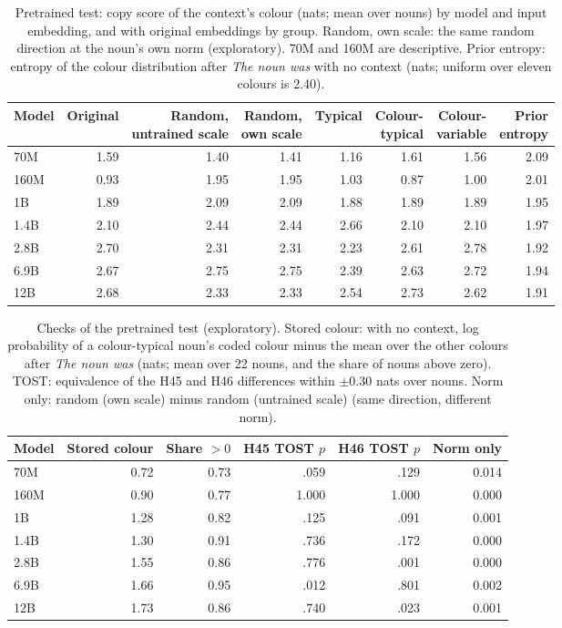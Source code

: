 \begin{table}[!htbp]
\centering\small
\caption{Pretrained test: copy score of the context's colour (nats; mean over nouns) by model and input embedding, and with original embeddings by group. Random, own scale: the same random direction at the noun's own norm (exploratory). 70M and 160M are descriptive. Prior entropy: entropy of the colour distribution after \emph{The \textit{noun} was} with no context (nats; uniform over eleven colours is 2.40).}
\label{tab:N7}
\begin{tabular}{@{}lrrrrrrr@{}}
\toprule
Model & Original & \shortstack{Random,\\untrained scale} & \shortstack{Random,\\own scale} & Typical & \shortstack{Colour-\\typical} & \shortstack{Colour-\\variable} & \shortstack{Prior\\entropy} \\
\midrule
70M & 1.59 & 1.40 & 1.41 & 1.16 & 1.61 & 1.56 & 2.09 \\
160M & 0.93 & 1.95 & 1.95 & 1.03 & 0.87 & 1.00 & 2.01 \\
1B & 1.89 & 2.09 & 2.09 & 1.88 & 1.89 & 1.89 & 1.95 \\
1.4B & 2.10 & 2.44 & 2.44 & 2.66 & 2.10 & 2.10 & 1.97 \\
2.8B & 2.70 & 2.31 & 2.31 & 2.23 & 2.61 & 2.78 & 1.92 \\
6.9B & 2.67 & 2.75 & 2.75 & 2.39 & 2.63 & 2.72 & 1.94 \\
12B & 2.68 & 2.33 & 2.33 & 2.54 & 2.73 & 2.62 & 1.91 \\
\bottomrule
\end{tabular}
\end{table}

\begin{table}[!htbp]
\centering\small
\caption{Checks of the pretrained test (exploratory). Stored colour: with no context, log probability of a colour-typical noun's coded colour minus the mean over the other colours after \emph{The \textit{noun} was} (nats; mean over 22 nouns, and the share of nouns above zero). TOST: equivalence of the H45 and H46 differences within $\pm$0.30 nats over nouns. Norm only: random (own scale) minus random (untrained scale) (same direction, different norm).}
\label{tab:N12}
\begin{tabular}{@{}lrrrrr@{}}
\toprule
Model & Stored colour & Share $>0$ & H45 TOST $p$ & H46 TOST $p$ & Norm only \\
\midrule
70M & 0.72 & 0.73 & .059 & .129 & 0.014 \\
160M & 0.90 & 0.77 & 1.000 & 1.000 & 0.000 \\
1B & 1.28 & 0.82 & .125 & .091 & 0.001 \\
1.4B & 1.30 & 0.91 & .736 & .172 & 0.000 \\
2.8B & 1.55 & 0.86 & .776 & .001 & 0.000 \\
6.9B & 1.66 & 0.95 & .012 & .801 & \textminus{}0.002 \\
12B & 1.73 & 0.86 & .740 & .023 & \textminus{}0.001 \\
\bottomrule
\end{tabular}
\end{table}



